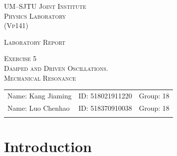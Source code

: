 \documentclass[a4paper]{article}
\begin{document}
\vspace*{0.4cm}

\hrulefill %

\thispagestyle{empty} %

\begin{center}
\begin{large}
\scshape{UM--SJTU Joint Institute \vspace{0.3em} \\ Physics Laboratory \\(Vp141)}
\end{large}

\hrulefill %

\vspace*{6cm}
\begin{Large}
\scshape{{Laboratory Report}}
\end{Large}

\vspace{2em}

\begin{large}
\scshape{Exercise 5}\\
\vspace{0.5em}
\scshape{Damped and Driven Oscillations.}\\
\scshape{Mechanical Resonance}\\
\end{large}
\end{center}
\vfill %

\begin{table}[htbp] %
\flushleft
\begin{tabular}{lll}
Name: Kang Jiaming \hspace*{3em} & ID: 518021911220 \hspace*{3em} & Group: 18\\
Name: Luo Chenhao \hspace*{3em} & ID: 518370910038 \hspace*{3em} & Group: 18\\
\\
\end{tabular}
\end{table}

\hfill %
\newpage
\tableofcontents
\setcounter{page}{0} %
\thispagestyle{empty}
\newpage



\section{Introduction}\label{Sec:intro}
\end{document}
